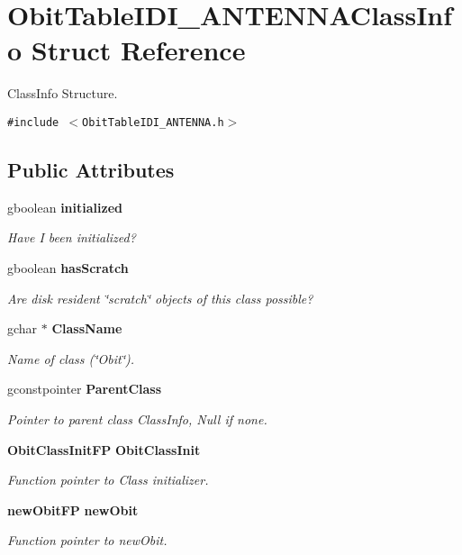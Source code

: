 \section{Obit\-Table\-IDI\_\-ANTENNAClass\-Info Struct Reference}
\label{structObitTableIDI__ANTENNAClassInfo}
Class\-Info Structure.  


{\tt \#include $<$Obit\-Table\-IDI\_\-ANTENNA.h$>$}

\subsection*{Public Attributes}
\begin{CompactItemize}
\item 
gboolean {\bf initialized}
\begin{CompactList}\small\item\em Have I been initialized? \item\end{CompactList}\item 
gboolean {\bf has\-Scratch}
\begin{CompactList}\small\item\em Are disk resident \char`\"{}scratch\char`\"{} objects of this class possible? \item\end{CompactList}\item 
gchar $\ast$ {\bf Class\-Name}
\begin{CompactList}\small\item\em Name of class (\char`\"{}Obit\char`\"{}). \item\end{CompactList}\item 
gconstpointer {\bf Parent\-Class}
\begin{CompactList}\small\item\em Pointer to parent class Class\-Info, Null if none. \item\end{CompactList}\item 
{\bf Obit\-Class\-Init\-FP} {\bf Obit\-Class\-Init}
\begin{CompactList}\small\item\em Function pointer to Class initializer. \item\end{CompactList}\item 
{\bf new\-Obit\-FP} {\bf new\-Obit}
\begin{CompactList}\small\item\em Function pointer to new\-Obit. \item\end{CompactList}\item 

\end{CompactItemize}
